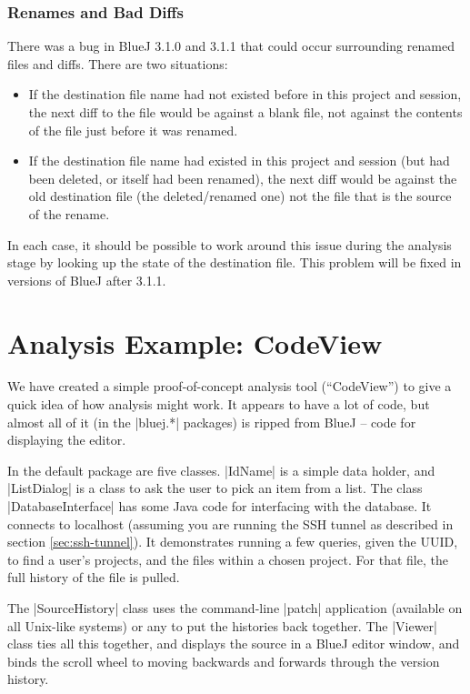 \documentclass{report}
\begin{document}
\subsection{Renames and Bad Diffs}

There was a bug in BlueJ 3.1.0 and 3.1.1 that could occur surrounding renamed files and diffs.  There are two situations:

\begin{itemize}
\item If the destination file name had not existed before in this project and session, the next diff to the file would be against
a blank file, not against the contents of the file just before it was renamed.
\item If the destination file name had existed in this project and session (but had been deleted, or itself had been renamed),
the next diff would be against the old destination file (the deleted/renamed one) not the file that is the source of the rename.
\end{itemize}

In each case, it should be possible to work around this issue during the analysis stage by looking up the state of the destination file.
This problem will be fixed in versions of BlueJ after 3.1.1.

\chapter{Analysis Example: CodeView}
\label{sec:example_codeview}

We have created a simple proof-of-concept analysis tool (``CodeView'') to give a quick idea
of how analysis might work.  It appears to have a lot of code, but almost all
of it (in the |bluej.*| packages) is ripped from BlueJ -- code for displaying
the editor.

In the default package are five classes.  |IdName| is a simple data holder,
and |ListDialog| is a class to ask the user to pick an item from a list.  The
class |DatabaseInterface| has some Java code for interfacing with the
database.  It connects to localhost (assuming you are running the SSH tunnel
as described in section \ref{sec:ssh-tunnel}).  It demonstrates running a few
queries, given the UUID, to find a user's projects, and the files within a
chosen project.  For that file, the full history of the file is pulled.

The |SourceHistory| class uses the command-line |patch| application (available on all Unix-like systems) or any
to put the histories back together.  The |Viewer| class ties all this
together, and displays the source in a BlueJ editor window, and binds the
scroll wheel to moving backwards and forwards through the version history.
\end{document}
